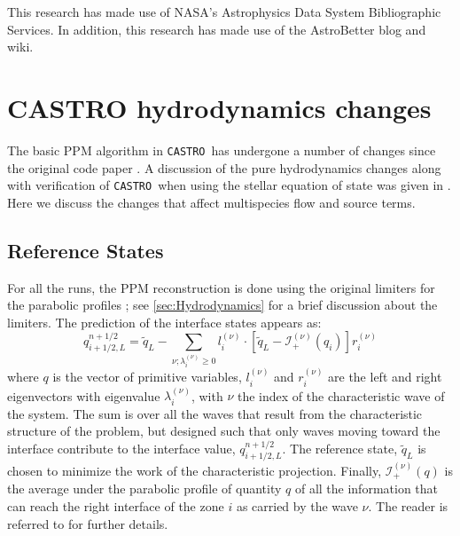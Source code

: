 \documentclass[iop,numberedappendix]{../emulateapj}
\newcommand{\castro}{\texttt{CASTRO}}
\begin{document}
This research has made use of NASA's Astrophysics Data System 
Bibliographic Services. In addition, this research has made use
of the AstroBetter blog and wiki.

\clearpage

\appendix

\section{CASTRO hydrodynamics changes}
\label{app:hydro}

The basic PPM algorithm in \castro\ has undergone a number of changes
since the original code paper \citep{castro}.  A discussion of the
pure hydrodynamics changes along with verification of \castro\ when
using the stellar equation of state was given in
\citet{zingalekatz:2015}.  Here we discuss the changes that affect
multispecies flow and source terms.

\subsection{Reference States}

For all the runs, the PPM reconstruction is done using the original limiters for
the parabolic profiles \citep{ppm}; see \autoref{sec:Hydrodynamics} for a brief 
discussion about the limiters.  The prediction of the interface
states appears as:
\begin{equation}
\label{eq:ppmstatel}
q_{i+1/2,L}^{n+1/2} = \tilde{q}_L -
   \sum_{\nu;\lambda_i^{(\nu)}\ge 0} l_i^{(\nu)} \cdot \left [
        \tilde{q}_L  - \mathcal{I}^{(\nu)}_+(q_i)
       \right ] r_i^{(\nu)}
\end{equation}
where $q$ is the vector of primitive variables, $l_i^{(\nu)}$ and
$r_i^{(\nu)}$ are the left and right eigenvectors with eigenvalue
$\lambda_i^{(\nu)}$, with $\nu$ the index of the characteristic wave of
the system.  The sum is over all the waves that result from the
characteristic structure of the problem, but designed such that only
waves moving toward the interface contribute to the interface value,
$q_{i+1/2,L}^{n+1/2}$.  The reference state, $\tilde{q}_L$ is
chosen to minimize the work of the characteristic projection.
Finally, $\mathcal{I}_+^{(\nu)}(q)$ is the
average under the parabolic profile of quantity $q$ of all the
information that can reach the right interface of the zone $i$ as
carried by the wave $\nu$.  The reader is referred to
\citet{ppmunsplit} for further details.
\end{document}
